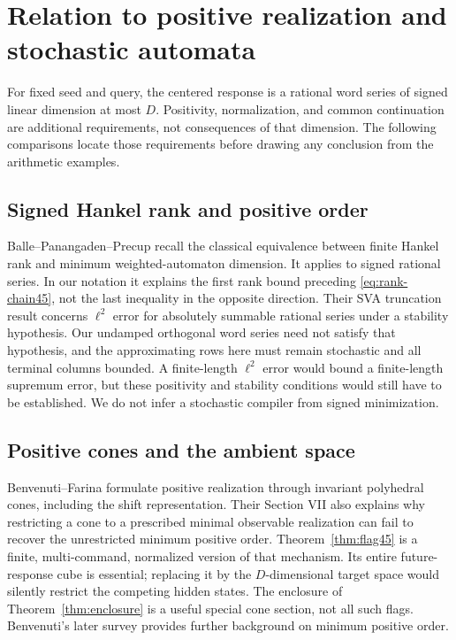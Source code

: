 \section{Relation to positive realization and stochastic automata}\label{sec:literature45}
For fixed seed and query, the centered response is a rational word series of signed linear dimension at most $D$. Positivity, normalization, and common continuation are additional requirements, not consequences of that dimension. The following comparisons locate those requirements before drawing any conclusion from the arithmetic examples.

\subsection{Signed Hankel rank and positive order}
Balle--Panangaden--Precup \cite[Theorem 2]{BPP} recall the classical equivalence between finite Hankel rank and minimum weighted-automaton dimension. It applies to signed rational series. In our notation it explains the first rank bound preceding \eqref{eq:rank-chain45}, not the last inequality in the opposite direction. Their SVA truncation result \cite[Theorem 11]{BPP} concerns $\ell^2$ error for absolutely summable rational series under a stability hypothesis. Our undamped orthogonal word series need not satisfy that hypothesis, and the approximating rows here must remain stochastic and all terminal columns bounded. A finite-length $\ell^2$ error would bound a finite-length supremum error, but these positivity and stability conditions would still have to be established. We do not infer a stochastic compiler from signed minimization.

\subsection{Positive cones and the ambient space}
Benvenuti--Farina \cite[Theorems 2--3]{BF} formulate positive realization through invariant polyhedral cones, including the shift representation. Their Section VII also explains why restricting a cone to a prescribed minimal observable realization can fail to recover the unrestricted minimum positive order. Theorem~\ref{thm:flag45} is a finite, multi-command, normalized version of that mechanism. Its entire future-response cube is essential; replacing it by the $D$-dimensional target space would silently restrict the competing hidden states. The enclosure of Theorem~\ref{thm:enclosure} is a useful special cone section, not all such flags. Benvenuti's later survey \cite{Ben22} provides further background on minimum positive order.

